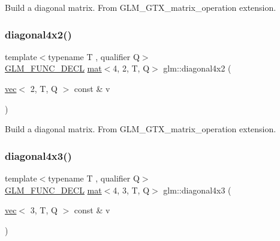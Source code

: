 Build a diagonal matrix. From G\+L\+M\+\_\+\+G\+T\+X\+\_\+matrix\+\_\+operation extension. \mbox{\label{group__gtx__matrix__operation_gacb8969e6543ba775c6638161a37ac330}} 
\subsubsection{\texorpdfstring{diagonal4x2()}{diagonal4x2()}}
{\footnotesize\ttfamily template$<$typename T , qualifier Q$>$ \\
\mbox{\hyperlink{setup_8hpp_ab2d052de21a70539923e9bcbf6e83a51}{G\+L\+M\+\_\+\+F\+U\+N\+C\+\_\+\+D\+E\+CL}} \mbox{\hyperlink{structglm_1_1mat}{mat}}$<$4, 2, T, Q$>$ glm\+::diagonal4x2 (\begin{DoxyParamCaption}\item[{\mbox{\hyperlink{structglm_1_1vec}{vec}}$<$ 2, T, Q $>$ const \&}]{v }\end{DoxyParamCaption})}

Build a diagonal matrix. From G\+L\+M\+\_\+\+G\+T\+X\+\_\+matrix\+\_\+operation extension. \mbox{\label{group__gtx__matrix__operation_gae235def5049d6740f0028433f5e13f90}} 
\subsubsection{\texorpdfstring{diagonal4x3()}{diagonal4x3()}}
{\footnotesize\ttfamily template$<$typename T , qualifier Q$>$ \\
\mbox{\hyperlink{setup_8hpp_ab2d052de21a70539923e9bcbf6e83a51}{G\+L\+M\+\_\+\+F\+U\+N\+C\+\_\+\+D\+E\+CL}} \mbox{\hyperlink{structglm_1_1mat}{mat}}$<$4, 3, T, Q$>$ glm\+::diagonal4x3 (\begin{DoxyParamCaption}\item[{\mbox{\hyperlink{structglm_1_1vec}{vec}}$<$ 3, T, Q $>$ const \&}]{v }\end{DoxyParamCaption})}

